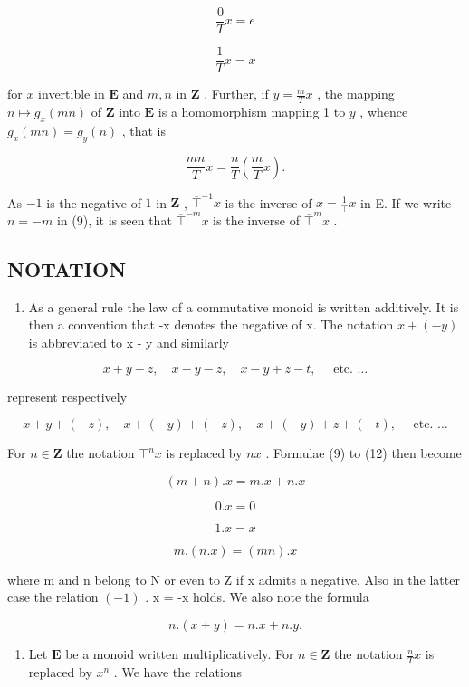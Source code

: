 \[
\frac {0}{T} x = e\tag{10}
\]

\[
\frac {1}{T} x = x\tag{11}
\]

for \(x\) invertible in \(\mathbf{E}\) and \(m, n\) in \(\mathbf{Z}\) . Further, if \(y = \frac{m}{T} x\) , the mapping \(n \mapsto g_x(mn)\) of \(\mathbf{Z}\) into \(\mathbf{E}\) is a homomorphism mapping 1 to \(y\) , whence \(g_x(mn) = g_y(n)\) , that is

\[
\frac {m n}{T} x = \frac {n}{T} \left(\frac {m}{T} x\right).\tag{12}
\]

As \(-1\) is the negative of \(1\) in \(\mathbf{Z}\) , \(\overline{\top}^{-1}x\) is the inverse of \(x = \frac{1}{\top} x\) in E. If we write \(n = -m\) in (9), it is seen that \(\overline{\top}^{-m}x\) is the inverse of \(\overline{\top}^{m}x\) .

\subsection{NOTATION}

\begin{enumerate}
\def\labelenumi{(\alph{enumi})}
\tightlist
\item
  As a general rule the law of a commutative monoid is written additively. It is then a convention that -x denotes the negative of x. The notation \(x + (-y)\) is abbreviated to x - y and similarly
\end{enumerate}

\[
x + y - z, \quad x - y - z, \quad x - y + z - t, \quad \text { etc. } \dots
\]

represent respectively

\[
x + y + (- z), \quad x + (- y) + (- z), \quad x + (- y) + z + (- t), \quad \text { etc. } \dots
\]

For \(n \in \mathbf{Z}\) the notation \(\top^n x\) is replaced by \(nx\) . Formulae (9) to (12) then become

\[
(m + n). x = m. x + n. x\tag{13}
\]

\[
0. x = 0\tag{14}
\]

\[
1. x = x\tag{15}
\]

\[
m. (n. x) = (m n). x\tag{16}
\]

where m and n belong to N or even to Z if x admits a negative. Also in the latter case the relation \((-1)\) . x = -x holds. We also note the formula

\[
n. (x + y) = n. x + n. y.\tag{17}
\]

\begin{enumerate}
\def\labelenumi{(\alph{enumi})}
\setcounter{enumi}{1}
\tightlist
\item
  Let \(\mathbf{E}\) be a monoid written multiplicatively. For \(n \in \mathbf{Z}\) the notation \(\frac{n}{T} x\) is replaced by \(x^n\) . We have the relations
\end{enumerate}

